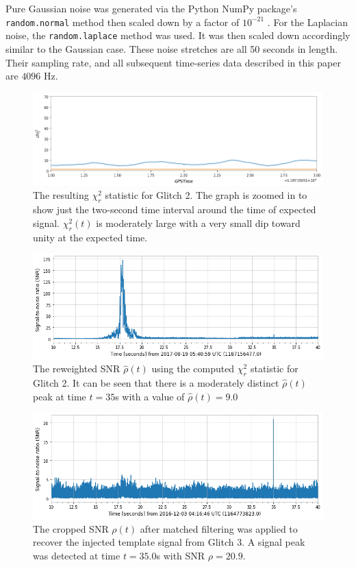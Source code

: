 \documentclass[preprint,
letterpaper,
 amsmath,amssymb,
 aps,
]{revtex4-2}
\def\code#1{\texttt{#1}}
\begin{document}
Pure Gaussian noise was generated via the Python NumPy package's \code{random.normal} method then scaled down by a factor of $10^{-21}$ \cite{numpy}. For the Laplacian noise, the \code{random.laplace} method was used. It was then scaled down accordingly similar to the Gaussian case. These noise stretches are all 50 seconds in length. Their sampling rate, and all subsequent time-series data described in this paper are $4096$ Hz.

\begin{widetext}
\begin{figure}[t]
\includegraphics[width = .9\textwidth]{chi2 glitch 2.png}
\caption{The resulting $\chi^2_r$ statistic for Glitch 2. The graph is zoomed in to show just the two-second time interval around the time of expected signal. $\chi_r^2(t)$ is moderately large with a very small dip toward unity at the expected time.}
\centering
\end{figure} 

\begin{figure}[t]
\includegraphics[width = .9\textwidth]{reweighted glitch 2.png}
\caption{The reweighted SNR $\hat{\rho}(t)$ using the computed $\chi^2_r$ statistic for Glitch 2. It can be seen that there is a moderately distinct $\hat{\rho}(t)$ peak at time $t=35$s with a value of $\hat{\rho}(t)=9.0$}
\centering
\end{figure}
\end{widetext}

\begin{figure}[t]\label{snr 3}
\includegraphics[width = .9\textwidth]{glitch 3 template 1.png}
\caption{The cropped SNR $\rho(t)$ after matched filtering was applied to recover the injected template signal from Glitch 3. A signal peak was detected at time $t = 35.0$s with SNR $\rho = 20.9$.}
\centering
\end{figure}
\end{document}
